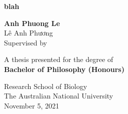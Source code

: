 \begin{titlepage}
    \begin{center}
        \vspace*{1cm}
        \Huge
        \textbf{blah} \\

        \LARGE
        \vspace{3cm}
            
        \textbf{Anh Phuong Le} \\
        \normalsize
        \foreignlanguage{vietnamese}{Lê Anh Phương} \\
        \vspace{1cm}
        Supervised by 
            
        \vfill
        
        \large   
        A thesis presented for the degree of\\
        \textbf{Bachelor of Philosophy (Honours)} \\
            
        \vspace{0.8cm}
            
            
        \Large
        Research School of Biology\\
        The Australian National University\\
        November 5, 2021 \\
            
    \end{center}
\end{titlepage}